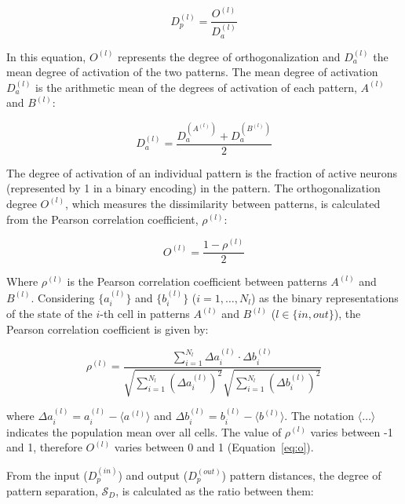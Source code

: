 \begin{equation}
    \label{eq:dp}
    D_p^{(l)} = \frac{O^{(l)}}{D_a^{(l)}}
\end{equation}

In this equation, $O^{(l)}$ represents the degree of orthogonalization and $D_a^{(l)}$ the mean degree of activation of the
two patterns. The mean degree of activation $D_a^{(l)}$ is the arithmetic mean of the degrees of activation of each pattern,
$A^{(l)}$ and $B^{(l)}$:

\begin{equation}
    \label{eq:da}
    D_a^{(l)} = \frac{D_a^{(A^{(l)})} + D_a^{(B^{(l)})}}{2}
\end{equation}

The degree of activation of an individual pattern is the fraction of active neurons (represented by 1 in a binary encoding) in
the pattern. The orthogonalization degree $O^{(l)}$, which measures the dissimilarity between patterns, is calculated from the
Pearson correlation coefficient, $\rho^{(l)}$:

\begin{equation}
    \label{eq:o}
    O^{(l)} = \frac{1 - \rho^{(l)}}{2}
\end{equation}

Where $\rho^{(l)}$ is the Pearson correlation coefficient between patterns $A^{(l)}$ and $B^{(l)}$.
Considering $\{a_i^{(l)}\}$ and $\{b_i^{(l)}\}$ ($i=1, \dots, N_l$) as the binary representations of the state of the
$i$-th cell in patterns $A^{(l)}$ and $B^{(l)}$ ($l \in \{in, out\}$), the Pearson correlation coefficient is given by:

\begin{equation}
    \label{eq:pearson}
    \rho^{(l)} = \frac{\sum_{i=1}^{N_l} \Delta a_i^{(l)} \cdot \Delta b_i^{(l)}}{\sqrt{\sum_{i=1}^{N_l} (\Delta a_i^{(l)})^2} \sqrt{\sum_{i=1}^{N_l} (\Delta b_i^{(l)})^2}}
\end{equation}

where $\Delta a_i^{(l)} = a_i^{(l)} - \langle a^{(l)} \rangle$ and $\Delta b_i^{(l)} = b_i^{(l)} - \langle b^{(l)} \rangle$.
The notation $\langle \dots \rangle$ indicates the population mean over all cells. The value of $\rho^{(l)}$ varies between
-1 and 1, therefore $O^{(l)}$ varies between 0 and 1 (Equation~\ref{eq:o}).

From the input ($D_p^{(in)}$) and output ($D_p^{(out)}$) pattern distances, the degree of pattern separation,
$\mathcal{S}_D$, is calculated as the ratio between them:

